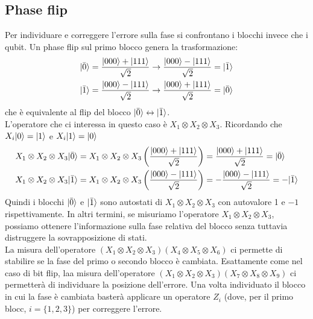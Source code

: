\documentclass[12pt, a4paper]{report}
\begin{document}
\subsection{Phase flip}
Per individuare e correggere l'errore sulla fase si confrontano i blocchi invece che i qubit. Un phase flip sul primo blocco genera la trasformazione:
\begin{equation*}
    \begin{split}
        | \bar{0} \rangle = \frac{| 000 \rangle+| 111 \rangle}{\sqrt{2}} &\rightarrow \frac{| 000 \rangle-| 111 \rangle}{\sqrt{2}} = | \bar{1} \rangle \\
        | \bar{1} \rangle = \frac{| 000 \rangle-| 111 \rangle}{\sqrt{2}} &\rightarrow \frac{| 000 \rangle+| 111 \rangle}{\sqrt{2}} = | \bar{0} \rangle
    \end{split}
\end{equation*} 
che è equivalente al flip del blocco $| \bar{0} \rangle\leftrightarrow| \bar{1} \rangle$.\\
L'operatore che ci interessa in questo caso è $X_{1}\otimes X_{2}\otimes X_{3}$. Ricordando che $X_{i}| 0 \rangle=| 1 \rangle$ e $X_{i}| 1 \rangle=| 0 \rangle$
\begin{equation*}
    \begin{split}
        X_{1}\otimes X_{2}\otimes X_{3}| \bar{0} \rangle &= X_{1}\otimes X_{2}\otimes X_{3}\left(\frac{| 000 \rangle+| 111 \rangle}{\sqrt{2}}\right) = \frac{| 000 \rangle+| 111 \rangle}{\sqrt{2}} = | \bar{0} \rangle \\
        X_{1}\otimes X_{2}\otimes X_{3}| \bar{1} \rangle &= X_{1}\otimes X_{2}\otimes X_{3}\left(\frac{| 000 \rangle-| 111 \rangle}{\sqrt{2}}\right) = -\frac{| 000 \rangle-| 111 \rangle}{\sqrt{2}} = -| \bar{1} \rangle
    \end{split}
\end{equation*}
Quindi i blocchi $| \bar{0} \rangle$ e $| \bar{1} \rangle$ sono autostati di $X_{1}\otimes X_{2}\otimes X_{3}$ con autovalore 1 e $-1$ rispettivamente. In altri termini, se misuriamo l'operatore $X_{1}\otimes X_{2}\otimes X_{3}$, possiamo ottenere l'informazione sulla fase relativa del blocco senza tuttavia distruggere la sovrapposizione di stati.\\
La misura dell'operatore $(X_{1}\otimes X_{2}\otimes X_{3})(X_{4}\otimes X_{5}\otimes X_{6})$ ci permette di stabilire se la fase  del primo o secondo blocco è cambiata. Esattamente come nel caso di bit flip, laa misura dell'operatore $(X_{1}\otimes X_{2}\otimes X_{3})(X_{7}\otimes X_{8}\otimes X_{9})$ ci permetterà di individuare la posizione dell'errore. Una volta individuato il blocco in cui la fase è cambiata basterà applicare un operatore $Z_{i}$ (dove, per il primo blocc, $i=\{1,2,3\}$) per correggere l'errore.
\end{document}
